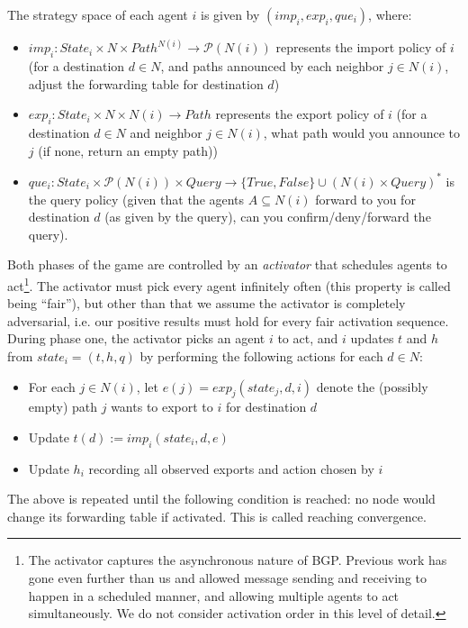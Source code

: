 \documentclass[12pt]{article}
\begin{document}
  The strategy space of each agent $i$ is given by $(imp_i, exp_i, que_i)$, where:
  \begin{itemize}
    \item $imp_i : State_i \times N \times Path^{N(i)} \to 
      \mathcal P(N(i))$ represents the 
      import policy of $i$ (for a destination $d\in N$, and paths announced by each
      neighbor $j\in N(i)$, adjust the forwarding table for destination $d$)
    \item $exp_i : State_i \times N \times N(i) \to Path$ represents
      the export policy of $i$ (for a destination $d\in N$ and neighbor $j\in N(i)$,
      what path would you announce to $j$ (if none, return an empty path))
    \item $que_i : State_i \times \mathcal P (N(i)) \times Query
      \to \{True, False\} \cup (N(i)\times Query)^*$ is the query policy
      (given that the agents $A\subseteq N(i)$ forward to you for destination
      $d$ (as given by the query), can you confirm/deny/forward the query).
  \end{itemize}

  Both phases of the game are controlled by an \emph{activator}
  that schedules agents to act\footnote{
    The activator captures the asynchronous nature of BGP.
    Previous work \cite{PolicyPathVector, RoutingGames} has gone
    even further than us and allowed message
    sending and receiving to happen in a scheduled manner,
    and allowing multiple agents to act simultaneously.
    We do not consider activation order in this level of detail.
  }. The activator must pick every agent infinitely often
  (this property is called being ``fair''),
  but other than that we assume the activator is completely adversarial,
  i.e. our positive results must hold for every fair activation sequence.
  During phase one, the activator picks an agent $i$ to act,
  and $i$ updates $t$ and $h$ from
  $state_i=(t,h,q)$ by performing the following actions
  for each $d\in N$:
  \begin{itemize}
    \item For each $j\in N(i)$, let $e(j) = exp_j(state_j, d, i)$
      denote the (possibly empty) path $j$ wants to export to $i$
      for destination $d$
    \item Update $t(d) := imp_i(state_i, d, e)$
    \item Update $h_i$ recording all observed exports and action chosen by $i$
  \end{itemize}
  The above is repeated until the following condition is reached:
  no node would change its forwarding table if activated.
  This is called reaching convergence.
\end{document}

